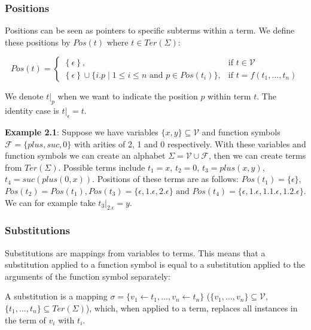 \subsubsection*{Positions}
Positions can be seen as pointers to specific subterms within a term. We define these positions by $\textit{Pos}\left(t\right)$ where $t \in \textit{Ter}\left(\Sigma\right)$:
\begin{definition}
$$
\textit{Pos}(t) = \left\{\begin{array}{ll}
        \left\{\epsilon\right\}, & \text{if } t \in \mathcal{V}\\
        \left\{\epsilon\right\} \cup \{i.p \mid 1 \leq i \leq n \text{ and } p  \in \textit{Pos}(t_i)\} , & \text{if } t = f(t_1, \dots, t_n)
        \end{array}\right.
$$
\end{definition}
We denote $\left.t\right|_p$ when we want to indicate the position $p$ within term $t$. The identity case is $\left.t\right|_\epsilon = t$.

\textbf{Example 2.1}: Suppose we have variables $\{ x, y \} \subseteq \mathcal{V}$ and function symbols $\mathcal{F} = \{ plus, suc, 0\}$ with arities of 2, 1 and 0 respectively. With these variables and function symbols we can create an alphabet $\Sigma = \mathcal{V} \cup \mathcal{F}$, then we can create terms from $\textit{Ter}(\Sigma)$. Possible terms include $t_1 = x$, $t_2 = 0$, $t_3 = plus(x, y)$, $t_4 = suc(plus(0, x))$. Positions of these terms are as follows: $\textit{Pos}(t_1) = \{ \epsilon \}$, $\textit{Pos}(t_2) = \textit{Pos}(t_1), \textit{Pos}(t_3) = \{ \epsilon, 1.\epsilon, 2.\epsilon \} \text{ and }\textit{Pos}(t_4) = \{ \epsilon, 1.\epsilon, 1.1.\epsilon, 1.2.\epsilon \}$. We can for example take $\left. t_3\right|_{2.\epsilon} = y$.

\subsubsection*{Substitutions}
Substitutions are mappings from variables to terms. This means that a substitution applied to a function symbol is equal to a substitution applied to the arguments of the function symbol separately:
\begin{definition}
A substitution is a mapping $\sigma = \{ v_1 \leftarrow t_1, \dots, v_n \leftarrow t_n \}$ ($\{ v_1, \dots, v_n \} \subseteq \mathcal{V}$, $\{ t_1, \dots, t_n\} \subseteq \textit{Ter}(\Sigma)$), which, when applied to a term, replaces all instances in the term of $v_i$ with $t_i$.
\end{definition}

